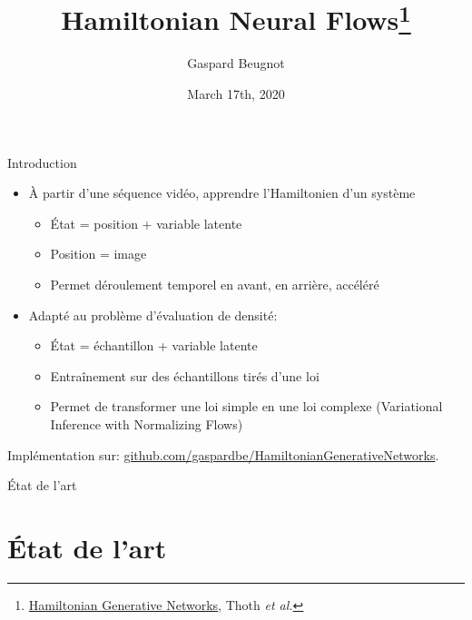 \documentclass{beamer}
\title[HNF]{Hamiltonian Neural Flows\footnote{\href{https://arxiv.org/abs/1909.13789}{Hamiltonian Generative Networks}, Thoth \textit{et al.}}}
\author[Gaspard B.]{Gaspard Beugnot}
\date{March 17th, 2020}
\begin{document}
\begin{frame}
\titlepage
\end{frame}

\begin{frame}{Introduction}
\begin{itemize}
    \item À partir d'une séquence vidéo, apprendre l'Hamiltonien d'un système
    \begin{itemize}
        \item État = position + variable latente 
        \item Position = image
        \item Permet déroulement temporel en avant, en arrière, accéléré
    \end{itemize}
    \item Adapté au problème d'évaluation de densité:
    \begin{itemize}
        \item État = échantillon + variable latente
        \item Entraînement sur des échantillons tirés d'une loi
        \item Permet de transformer une loi simple en une loi complexe (Variational Inference with Normalizing Flows)
    \end{itemize}
\end{itemize}

Implémentation sur: \href{https://github.com/gaspardbe/HamiltonianGenerativeNetworks}{github.com/gaspardbe/HamiltonianGenerativeNetworks}.
\end{frame}

\begin{frame}{État de l'art}
\section{État de l'art}
\tableofcontents[currentsection]
\end{frame}
\end{document}
